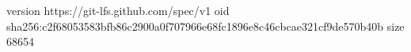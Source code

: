 version https://git-lfs.github.com/spec/v1
oid sha256:c2f68053583bfb86c2900a0f707966e68fc1896e8c46cbcae321cf9de570b40b
size 68654
